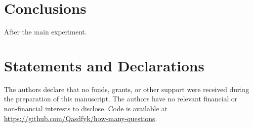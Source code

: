 \documentclass[twocolumn]{svjour3}
\newcommand{\plan}[1]{{\color{blue!70!black}#1}}
\begin{document}
\section{Conclusions}
\plan{After the main experiment.}

\section*{Statements and Declarations}
The authors declare that no funds, grants, or other support were received during the preparation of this
manuscript. The authors have no relevant financial or non-financial interests to disclose. Code is
available at \url{https://github.com/Qasdfyk/how-many-questions}.

\balance


\end{document}
